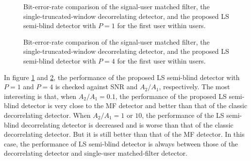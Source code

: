 \documentclass[a4paper,10pt,fleqn, twocolumn]{IEEETran}
\begin{document}
\begin{figure}
\caption{Bit-error-rate comparison of the signal-user matched
filter, the single-truncated-window decorrelating detector, and
the proposed LS semi-blind detector with $P=1$ for the first user
within users.} \label{LS11}
\end{figure}

\begin{figure}
\caption{Bit-error-rate comparison of the signal-user matched
filter, the single-truncated-window decorrelating detector, and
the proposed LS semi-blind detector with $P=4$ for the first user
within users.} \label{LS41}
\end{figure}

In figure \ref{LS11} and \ref{LS41}, the performance of the
proposed LS semi-blind detector with $P=1$ and $P=4$ is checked
against SNR and $A_2/A_1$, respectively. The most interesting is
that, when $A_2/A_1=0.1$, the performance of the proposed LS
semi-blind detector is very close to the MF detector and better
than that of the classic decorrelating detector. When $A_2/A_1=1$
or $10$, the performance of the LS semi-blind decorrelating
detector is decreased and is worse than that of the classic
decorrelating detector. But it is still better than that of the MF
detector. In this case, the performance of LS semi-blind detector
is always between those of the decorrelating detector and
single-user matched-filter detector.
\end{document}
